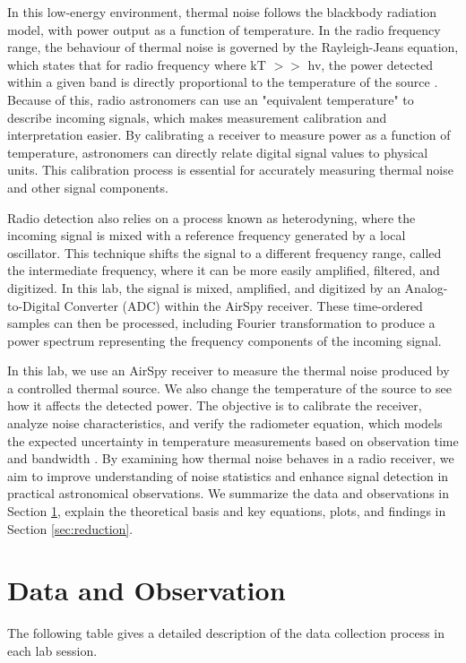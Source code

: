 \documentclass[10pt, preprint]{aastex}
\begin{document}
In this low-energy environment, thermal noise follows the blackbody radiation model, with power output as a function of temperature. In the radio frequency range, the behaviour of thermal noise is governed by the Rayleigh-Jeans equation, which states that for radio frequency where kT $>>$ hv, the power detected within a given band is directly proportional to the temperature of the source \cite{labmanual}. Because of this, radio astronomers can use an "equivalent temperature" to describe incoming signals, which makes measurement calibration and interpretation easier. By calibrating a receiver to measure power as a function of temperature, astronomers can directly relate digital signal values to physical units. This calibration process is essential for accurately measuring thermal noise and other signal components.

Radio detection also relies on a process known as heterodyning, where the incoming signal is mixed with a reference frequency generated by a local oscillator. This technique shifts the signal to a different frequency range, called the intermediate frequency, where it can be more easily amplified, filtered, and digitized. In this lab, the signal is mixed, amplified, and digitized by an Analog-to-Digital Converter (ADC) within the AirSpy receiver. These time-ordered samples can then be processed, including Fourier transformation to produce a power spectrum representing the frequency components of the incoming signal.

In this lab, we use an AirSpy receiver to measure the thermal noise produced by a controlled thermal source. We also change the temperature of the source to see how it affects the detected power. The objective is to calibrate the receiver, analyze noise characteristics, and verify the radiometer equation, which models the expected uncertainty in temperature measurements based on observation time and bandwidth \cite{labmanual}. By examining how thermal noise behaves in a radio receiver, we aim to improve understanding of noise statistics and enhance signal detection in practical astronomical observations. We summarize the data and observations in Section \ref{sec:data}, explain the theoretical basis and key equations, plots, and findings in Section \ref{sec:reduction}.

\section{Data and Observation}
\label{sec:data}

The following table gives a detailed description of the data collection process in each lab session.
\end{document}
